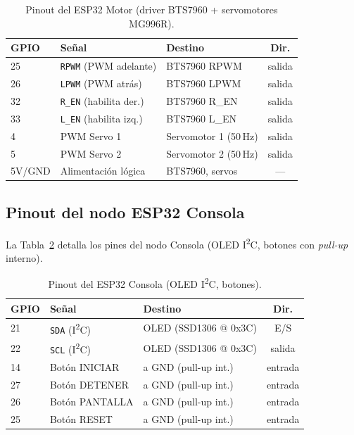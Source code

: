 \documentclass[12pt]{catolica_proyectos}
\begin{document}
\begin{table}[H]
\centering
\caption{Pinout del ESP32 Motor (driver BTS7960 + servomotores MG996R).}
\label{tab:pinmotor}
\footnotesize
\begin{tabular}{@{}lllc@{}}
\toprule
\textbf{GPIO} & \textbf{Señal} & \textbf{Destino} & \textbf{Dir.} \\
\midrule
25 & \texttt{RPWM} (PWM adelante) & BTS7960 RPWM & salida \\
26 & \texttt{LPWM} (PWM atrás) & BTS7960 LPWM & salida \\
32 & \texttt{R\_EN} (habilita der.) & BTS7960 R\_EN & salida \\
33 & \texttt{L\_EN} (habilita izq.) & BTS7960 L\_EN & salida \\
4 & PWM Servo 1 & Servomotor 1 (50\,Hz) & salida \\
5 & PWM Servo 2 & Servomotor 2 (50\,Hz) & salida \\
5V/GND & Alimentación lógica & BTS7960, servos & --- \\
\bottomrule
\end{tabular}
\end{table}

\subsection{Pinout del nodo ESP32 Consola}
La Tabla~\ref{tab:pinconsola} detalla los pines del nodo Consola (OLED I\textsuperscript{2}C, botones con \emph{pull-up} interno).

\begin{table}[H]
\centering
\caption{Pinout del ESP32 Consola (OLED I\textsuperscript{2}C, botones).}
\label{tab:pinconsola}
\footnotesize
\begin{tabular}{@{}lllc@{}}
\toprule
\textbf{GPIO} & \textbf{Señal} & \textbf{Destino} & \textbf{Dir.} \\
\midrule
21 & \texttt{SDA} (I\textsuperscript{2}C) & OLED (SSD1306 @ 0x3C) & E/S \\
22 & \texttt{SCL} (I\textsuperscript{2}C) & OLED (SSD1306 @ 0x3C) & salida \\
14 & Botón INICIAR & a GND (pull-up int.) & entrada \\
27 & Botón DETENER & a GND (pull-up int.) & entrada \\
26 & Botón PANTALLA & a GND (pull-up int.) & entrada \\
25 & Botón RESET & a GND (pull-up int.) & entrada \\
\bottomrule
\end{tabular}
\end{table}
\end{document}
